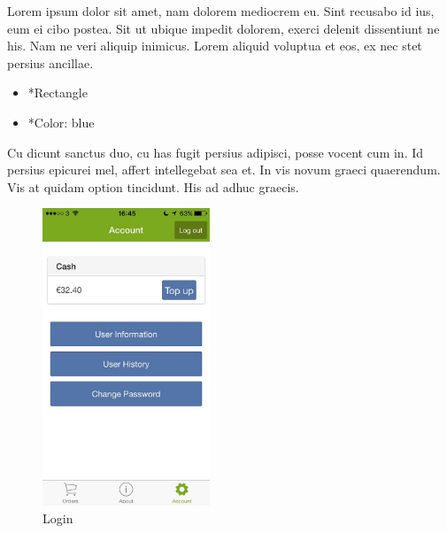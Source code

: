 \begin{minipage}{0.55\textwidth}
	Lorem ipsum dolor sit amet, nam dolorem mediocrem eu. Sint recusabo id ius, eum ei cibo postea. Sit ut ubique impedit dolorem, exerci delenit dissentiunt ne his. Nam ne veri aliquip inimicus. Lorem aliquid voluptua et eos, ex nec stet persius ancillae.
	\begin{itemize}
		\item *Rectangle
		\item *Color: blue
	\end{itemize}
	Cu dicunt sanctus duo, cu has fugit persius adipisci, posse vocent cum in. Id persius epicurei mel, affert intellegebat sea et. In vis novum graeci quaerendum. Vis at quidam option tincidunt. His ad adhuc graecis.
\end{minipage}
\begin{minipage}{5cm}
	\begin{figure}[H]
		\includegraphics[width=5cm]{img/mobile-app/screen-shots/IMG_2914.jpg}
		\caption{Login}
	\end{figure}
\end{minipage} \hfill


